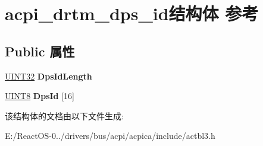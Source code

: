 \hypertarget{structacpi__drtm__dps__id}{}\section{acpi\+\_\+drtm\+\_\+dps\+\_\+id结构体 参考}
\label{structacpi__drtm__dps__id}
\subsection*{Public 属性}
\begin{DoxyCompactItemize}
\item 
\mbox{\label{structacpi__drtm__dps__id_a770485d2b167770a90f360fb770e6a02}} 
\hyperlink{_processor_bind_8h_ae1e6edbbc26d6fbc71a90190d0266018}{U\+I\+N\+T32} {\bfseries Dps\+Id\+Length}
\item 
\mbox{\label{structacpi__drtm__dps__id_ae1ff3d33917e03358b0ae211c132d0f2}} 
\hyperlink{_processor_bind_8h_ab27e9918b538ce9d8ca692479b375b6a}{U\+I\+N\+T8} {\bfseries Dps\+Id} \mbox{[}16\mbox{]}
\end{DoxyCompactItemize}


该结构体的文档由以下文件生成\+:\begin{DoxyCompactItemize}
\item 
E\+:/\+React\+O\+S-\/0../drivers/bus/acpi/acpica/include/actbl3.\+h\end{DoxyCompactItemize}
